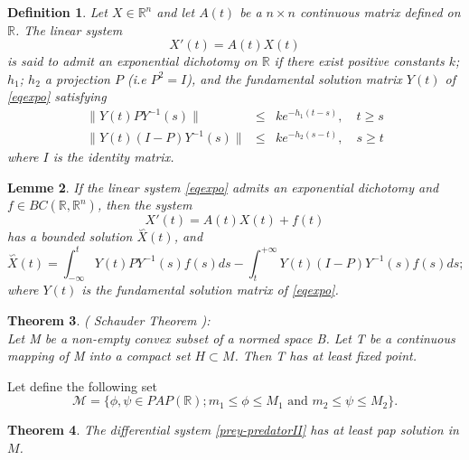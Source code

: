 \documentclass[[a4paper,10pt]{article}
\newcommand{\R}{\mathbb{R}}
\newtheorem{theorem}{Theorem}[section]
\newtheorem{lemma}[theorem]{Lemme}%
\newtheorem{definition}[theorem]{Definition}%
\begin{document}
\begin{definition} \cite{coppel2006dichotomies}Let $X\in \R^n$ and let $A(t)$ be a $n \times n$ continuous matrix defined on
$\R$. The linear system
\begin{equation}\label{eqexpo}
X'(t) = A(t)X(t) 
\end{equation}
is said to admit an exponential dichotomy on $\R$ if there exist positive constants $k$; $h_1$; $h_2$ a projection $P$ (i.e $P^2=I$), and the fundamental solution matrix $Y (t)$ of \eqref{eqexpo} satisfying
\begin{eqnarray*}
\|Y(t)PY^{-1}(s)\|&\leq& k e^{-h_1(t-s)},\quad t\geq s\\
\|Y(t)(I-P)Y^{-1}(s)\|&\leq& k e^{-h_2(s-t)},\quad  s\geq t
\end{eqnarray*}
where $I$ is the identity matrix.
\end{definition}
\begin{lemma}\cite{coppel2006dichotomies} \label{exdic}If the linear system \eqref{eqexpo} admits an exponential dichotomy and $f \in
BC(\R,\R^n)$, then the system
\begin{equation}
X'(t) = A(t)X(t) + f(t)
\end{equation}
has a bounded solution $\overset{\backsim}{X}(t)$, and
\begin{equation}
\displaystyle \overset{\backsim}{X}(t) = \int^t_{-\infty}Y(t)PY^{-1}(s)f(s)ds -\int_t^{+\infty}Y(t)(I - P)Y^{-1}(s)f(s)ds; \end{equation}
where $Y(t)$ is the fundamental solution matrix of \eqref{eqexpo}.
\end{lemma}



\begin{theorem}
( Schauder Theorem )\cite{smart1980fixed}: \\
Let M be a non-empty convex subset of a normed space B. Let T be
a continuous mapping of M into a compact set $H \subset M$. Then T has at least fixed point.
\end{theorem}

Let define the  following set 
$$\mathcal{ M}=\{\phi,\psi\in PAP(\R);m_1\leq\phi\leq M_1 \text{ and }m_2\leq\psi\leq M_2\}.$$

\begin{theorem}\label{existenceschauder}The  differential system  \eqref{prey-predatorII} has at least  pap solution in  $M$.
\end{theorem}
\end{document}
